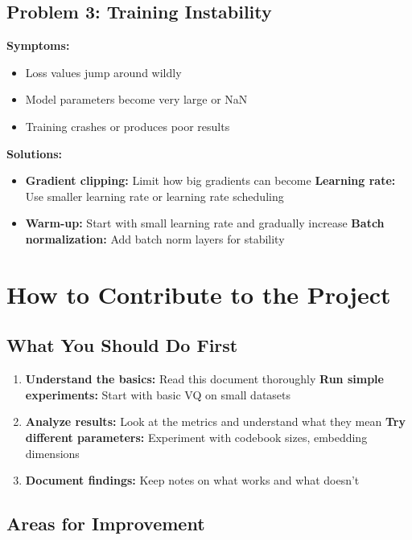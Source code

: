 \documentclass[12pt]{article}
\begin{document}
\subsection{Problem 3: Training Instability}

\textbf{Symptoms:}
\begin{itemize}
    \item Loss values jump around wildly
    \item Model parameters become very large or NaN
    \item Training crashes or produces poor results
\end{itemize}

\textbf{Solutions:}
\begin{itemize}
    \item \textbf{Gradient clipping:} Limit how big gradients can become
    \textbf{Learning rate:} Use smaller learning rate or learning rate scheduling
    \item \textbf{Warm-up:} Start with small learning rate and gradually increase
    \textbf{Batch normalization:} Add batch norm layers for stability
\end{itemize}

\section{How to Contribute to the Project}

\subsection{What You Should Do First}

\begin{enumerate}
    \item \textbf{Understand the basics:} Read this document thoroughly
    \textbf{Run simple experiments:} Start with basic VQ on small datasets
    \item \textbf{Analyze results:} Look at the metrics and understand what they mean
    \textbf{Try different parameters:} Experiment with codebook sizes, embedding dimensions
    \item \textbf{Document findings:} Keep notes on what works and what doesn't
\end{enumerate}

\subsection{Areas for Improvement}
\end{document}
